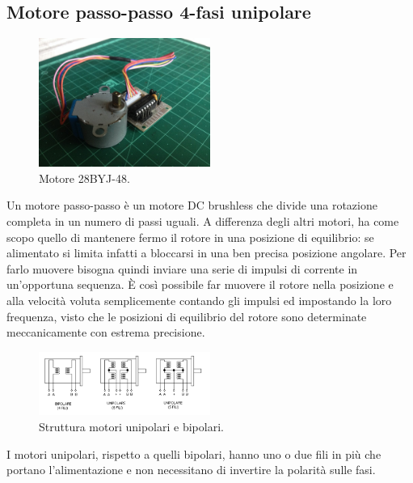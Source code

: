 \documentclass[12pt,oneside,a4paper]{article}
\begin{document}
\subsection{Motore passo-passo 4-fasi unipolare}
\begin{figure}[ht!]
    \centering
    \includegraphics[width=0.5\textwidth]{figures/motor28BYJ-48.jpg}
    \caption{Motore 28BYJ-48.}
\end{figure}
Un motore passo-passo\cite{StepMotor} è un motore DC brushless che divide una rotazione completa in un numero di passi uguali.
A differenza degli altri motori, ha come scopo quello di mantenere fermo il rotore in una posizione di equilibrio: se alimentato si limita infatti a bloccarsi in una ben precisa posizione angolare. Per farlo muovere bisogna quindi inviare una serie di impulsi di corrente in un'opportuna sequenza. È così possibile far muovere il rotore nella posizione e alla velocità voluta semplicemente contando gli impulsi ed impostando la loro frequenza, visto che le posizioni di equilibrio del rotore sono determinate meccanicamente con estrema precisione.

\begin{figure}[ht!]
    \centering
    \includegraphics[width=0.5\textwidth]{figures/unipolare-bipolare.png}
    \caption{Struttura motori unipolari e bipolari.}
\end{figure}
I motori unipolari, rispetto a quelli bipolari, hanno uno o due fili in più che portano l'alimentazione e non necessitano di invertire la polarità sulle fasi.
\end{document}
